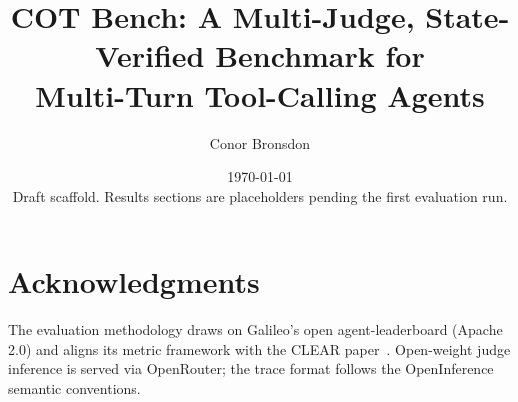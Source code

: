 \documentclass[11pt]{article}
\title{COT Bench: A Multi-Judge, State-Verified Benchmark for\\Multi-Turn Tool-Calling Agents}
\author[1]{Conor Bronsdon}
\affil[1]{Chain of Thought (independent)\\\texttt{conorbronsdon.github.io/cot-bench}}
\date{\today\\\footnotesize Draft scaffold. Results sections are placeholders pending the first evaluation run.}
\begin{document}
\maketitle

\begin{abstract}

\end{abstract}










\section*{Acknowledgments}
The evaluation methodology draws on Galileo's open agent-leaderboard (Apache 2.0)
and aligns its metric framework with the CLEAR paper~\cite{clear2025}.
Open-weight judge inference is served via OpenRouter; the trace format follows the
OpenInference semantic conventions.



\end{document}
